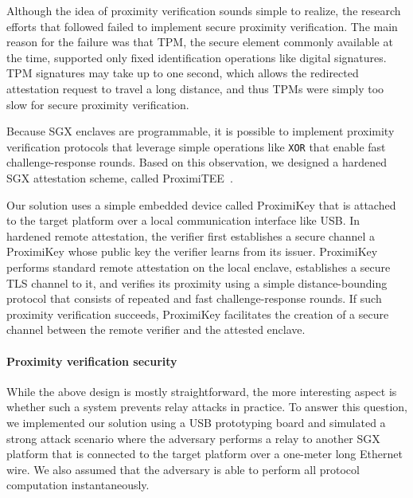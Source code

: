 \documentclass[letterpaper,twocolumn,10pt]{article}
\newcommand{\proximitee}{\textsf{ProximiTEE}\xspace}
\newcommand{\key}{\textsf{ProximiKey}\xspace}
\begin{document}
Although the idea of proximity verification sounds simple to realize, the research efforts that followed failed to implement secure proximity verification. The main reason for the failure was that TPM, the secure element commonly available at the time, supported only fixed identification operations like digital signatures. TPM signatures may take up to one second, which allows the redirected attestation request to travel a long distance, and thus TPMs were simply too slow for secure proximity verification. %

Because SGX enclaves are programmable, it is possible to implement proximity verification protocols that leverage simple operations like \texttt{XOR} that enable fast challenge-response rounds. Based on this observation, we designed a hardened SGX attestation scheme, called \proximitee~\cite{proximitee}. 

Our solution uses a simple embedded device called \key that is attached to the target platform over a local communication interface like USB. In hardened remote attestation, the verifier first establishes a secure channel a \key whose public key the verifier learns from its issuer. \key performs standard remote attestation on the local enclave, establishes a secure TLS channel to it, and verifies its proximity using a simple distance-bounding protocol that consists of repeated and fast challenge-response rounds. If such proximity verification succeeds, \key facilitates the creation of a secure channel between the remote verifier and the attested enclave. 


\paragraph{Proximity verification security} 

While the above design is mostly straightforward, the more interesting aspect is whether such a system prevents relay attacks in practice. To answer this question, we implemented our solution using a USB prototyping board and simulated a strong attack scenario where the adversary performs a relay to another SGX platform that is connected to the target platform over a one-meter long Ethernet wire. We also assumed that the adversary is able to perform all protocol computation instantaneously. 
\end{document}
